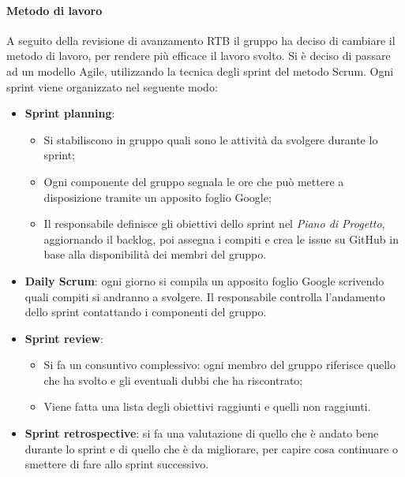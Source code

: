 \paragraph{Metodo di lavoro}
A seguito della revisione di avanzamento RTB il gruppo ha deciso di cambiare il metodo di lavoro, 
per rendere più efficace il lavoro svolto. Si è deciso di passare ad un modello Agile, utilizzando la tecnica degli sprint 
del metodo Scrum. Ogni sprint viene organizzato nel seguente modo:
\begin{itemize}
	\item \textbf{Sprint planning}:
	\begin{itemize}
		\item Si stabiliscono in gruppo quali sono le attività da svolgere durante lo sprint;
		\item Ogni componente del gruppo segnala le ore che può mettere a disposizione tramite un apposito foglio Google;
		\item Il responsabile definisce gli obiettivi dello sprint nel \textit{Piano di Progetto}, aggiornando il backlog, poi 
		assegna i compiti e crea le issue su GitHub in base alla disponibilità dei membri del gruppo.
	\end{itemize}
	\item \textbf{Daily Scrum}: ogni giorno si compila un apposito foglio Google scrivendo quali compiti si 
	andranno a svolgere. Il responsabile controlla l'andamento dello sprint contattando i componenti del gruppo.
	\item \textbf{Sprint review}:  
	\begin{itemize}
		\item Si fa un consuntivo complessivo: ogni membro del gruppo riferisce quello che ha svolto e 
		gli eventuali dubbi che ha riscontrato;
		\item Viene fatta una lista degli obiettivi raggiunti e quelli non raggiunti.
	\end{itemize}
	\item \textbf{Sprint retrospective}: si fa una valutazione di quello che è andato bene durante lo sprint
	 e di quello che è da migliorare, per capire cosa continuare o smettere di fare allo sprint successivo.

\end{itemize}
